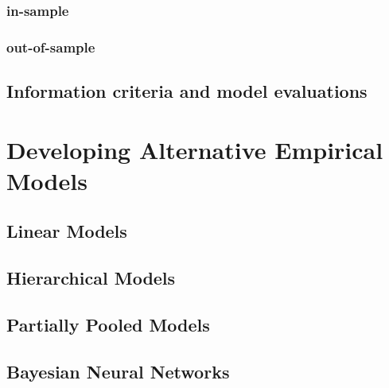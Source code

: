 \documentclass[10pt]{article}
\begin{document}
	\subsubsection{in-sample}
	\subsubsection{out-of-sample}
	\subsection{Information criteria and model evaluations}
	
\newpage
\section{Developing Alternative Empirical Models}
	\subsection{Linear Models}
	\subsection{Hierarchical Models}
	\subsection{Partially Pooled Models}
	\subsection{Bayesian Neural Networks}
\end{document}
